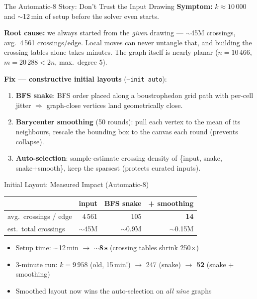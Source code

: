 \begin{frame}{The Automatic-8 Story: Don't Trust the Input Drawing}
  \textbf{Symptom:} $k\approx 10\,000$ and $\sim$12\,min of setup before the solver even starts.
  \medskip

  \textbf{Root cause:} we always started from the \emph{given} drawing ---
  $\sim$45M crossings, avg.\ 4\,561 crossings/edge. Local moves can never untangle that,
  and building the crossing tables alone takes minutes. The graph itself is nearly planar
  ($n=10\,466$, $m=20\,288 < 2n$, max.\ degree 5).
  \medskip

  \textbf{Fix --- constructive initial layouts} (\texttt{--init auto}):
  \begin{enumerate}
    \item \textbf{BFS snake}: BFS order placed along a boustrophedon grid path with per-cell jitter
          $\Rightarrow$ graph-close vertices land geometrically close.
    \item \textbf{Barycenter smoothing} (50 rounds): pull each vertex to the mean of its neighbours,
          rescale the bounding box to the canvas each round (prevents collapse).
    \item \textbf{Auto-selection}: sample-estimate crossing density of
          \{input, snake, snake+smooth\}, keep the sparsest (protects curated inputs).
  \end{enumerate}
\end{frame}

\begin{frame}{Initial Layout: Measured Impact (Automatic-8)}
  \begin{center}
    \begin{tabular}{lrrr}
      \toprule
      & \textbf{input} & \textbf{BFS snake} & \textbf{+ smoothing} \\
      \midrule
      avg.\ crossings / edge & 4\,561 & 105 & \textbf{14} \\
      est.\ total crossings  & $\sim$45M & $\sim$0.9M & $\sim$0.15M \\
      \bottomrule
    \end{tabular}
  \end{center}
  \medskip
  \begin{itemize}
    \item Setup time: $\sim$12\,min $\to$ \textbf{$\sim$8\,s} (crossing tables shrink 250$\times$)
    \item 3-minute run: $k = 9\,958$ (old, 15\,min!) $\to$ 247 (snake) $\to$ \textbf{52} (snake + smoothing)
    \item Smoothed layout now wins the auto-selection on \emph{all nine} graphs
  \end{itemize}
\end{frame}

